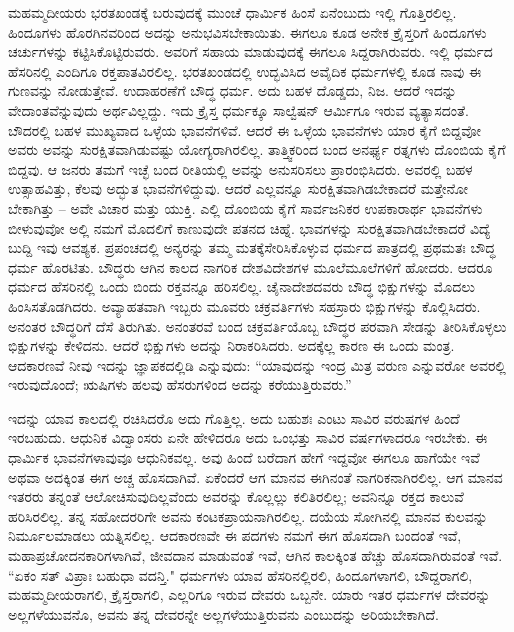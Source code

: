 ಮಹಮ್ಮದೀಯರು ಭರತಖಂಡಕ್ಕೆ ಬರುವುದಕ್ಕೆ ಮುಂಚೆ ಧಾರ್ಮಿಕ ಹಿಂಸೆ ಏನೆಂಬುದು ಇಲ್ಲಿ ಗೊತ್ತಿರಲಿಲ್ಲ. ಹಿಂದೂಗಳು ಹೊರಗಿನವರಿಂದ ಅದನ್ನು ಅನುಭವಿಸಬೇಕಾಯಿತು. ಈಗಲೂ ಕೂಡ ಅನೇಕ ಕ್ರೈಸ್ತರಿಗೆ ಹಿಂದೂಗಳು ಚರ್ಚುಗಳನ್ನು ಕಟ್ಟಿಸಿಕೊಟ್ಟಿರುವರು. ಅವರಿಗೆ ಸಹಾಯ ಮಾಡುವುದಕ್ಕೆ ಈಗಲೂ ಸಿದ್ದರಾಗಿರುವರು. ಇಲ್ಲಿ ಧರ್ಮದ ಹೆಸರಿನಲ್ಲಿ ಎಂದಿಗೂ ರಕ್ತಪಾತವಿರಲಿಲ್ಲ. ಭರತಖಂಡದಲ್ಲಿ ಉದ್ಭವಿಸಿದ ಅವೈದಿಕ ಧರ್ಮಗಳಲ್ಲಿ ಕೂಡ ನಾವು ಈ ಗುಣವನ್ನು ನೋಡುತ್ತೇವೆ. ಉದಾಹರಣೆಗೆ ಬೌದ್ಧ ಧರ್ಮ. ಅದು ಬಹಳ ದೊಡ್ಡದು, ನಿಜ. ಆದರೆ ಇದನ್ನು ವೇದಾಂತವೆನ್ನುವುದು ಅರ್ಥವಿಲ್ಲದ್ದು. ಇದು ಕ್ರೈಸ್ತ ಧರ್ಮಕ್ಕೂ ಸಾಲ್ವೆಷನ್ ಆರ್ಮಿಗೂ ಇರುವ ವ್ಯತ್ಯಾಸದಂತೆ. ಬೌದರಲ್ಲಿ ಬಹಳ ಮುಖ್ಯವಾದ ಒಳ್ಳೆಯ ಭಾವನೆಗಳಿವೆ. ಆದರೆ ಈ ಒಳ್ಳೆಯ ಭಾವನೆಗಳು ಯಾರ ಕೈಗೆ ಬಿದ್ದವೋ ಅವರು ಅವನ್ನು ಸುರಕ್ಷಿತವಾಗಿಡುವಷ್ಟು ಯೋಗ್ಯರಾಗಿರಲಿಲ್ಲ. ತಾತ್ತ್ವಿಕರಿಂದ ಬಂದ ಅನರ್ಘ್ಯ ರತ್ನಗಳು ದೊಂಬಿಯ ಕೈಗೆ ಬಿದ್ದವು. ಆ ಜನರು ತಮಗೆ ಇಚ್ಛೆ ಬಂದ ರೀತಿಯಲ್ಲಿ ಅವನ್ನು ಅನುಸರಿಸಲು ಪ್ರಾರಂಭಿಸಿದರು. ಅವರಲ್ಲಿ ಬಹಳ ಉತ್ಸಾಹವಿತ್ತು, ಕೆಲವು ಅದ್ಭುತ ಭಾವನೆಗಳಿದ್ದುವು. ಆದರೆ ಎಲ್ಲವನ್ನೂ ಸುರಕ್ಷಿತವಾಗಿಡಬೇಕಾದರೆ ಮತ್ತೇನೋ ಬೇಕಾಗಿತ್ತು – ಅವೇ ವಿಚಾರ ಮತ್ತು ಯುಕ್ತಿ. ಎಲ್ಲಿ ದೊಂಬಿಯ ಕೈಗೆ ಸಾರ್ವಜನಿಕರ ಉಪಕಾರಾರ್ಥ ಭಾವನೆಗಳು ಬೀಳುವುವೋ ಅಲ್ಲಿ ನಮಗೆ ಮೊದಲಿಗೆ ಕಾಣುವುದೇ ಪತನದ ಚಿಹ್ನೆ. ಭಾವಗಳನ್ನು ಸುರಕ್ಷಿತವಾಗಿಡಬೇಕಾದರೆ ವಿದ್ಯೆ ಬುದ್ದಿ ಇವು ಆವಶ್ಯಕ. ಪ್ರಪಂಚದಲ್ಲಿ ಅನ್ಯರನ್ನು ತಮ್ಮ ಮತಕ್ಕೆ\break ಸೇರಿಸಿಕೊಳ್ಳುವ ಧರ್ಮದ ಪಾತ್ರದಲ್ಲಿ ಪ್ರಥಮತಃ ಬೌದ್ಧ ಧರ್ಮ ಹೊರಟಿತು. ಬೌದ್ಧರು ಆಗಿನ ಕಾಲದ ನಾಗರಿಕ ದೇಶವಿದೇಶಗಳ ಮೂಲೆಮೂಲೆಗಳಿಗೆ ಹೋದರು. ಆದರೂ ಧರ್ಮದ ಹೆಸರಿನಲ್ಲಿ ಒಂದು ಬಿಂದು ರಕ್ತವನ್ನೂ ಹರಿಸಲಿಲ್ಲ. ಚೈನಾದೇಶದವರು ಬೌದ್ಧ ಭಿಕ್ಷುಗಳನ್ನು ಮೊದಲು ಹಿಂಸಿಸತೊಡಗಿದರು. ಅವ್ಯಾಹತವಾಗಿ ಇಬ್ಬರು ಮೂವರು ಚಕ್ರವರ್ತಿಗಳು ಸಹಸ್ರಾರು ಭಿಕ್ಷುಗಳನ್ನು ಕೊಲ್ಲಿಸಿದರು. ಅನಂತರ ಬೌದ್ಧರಿಗೆ ದೆಸೆ ತಿರುಗಿತು. ಅನಂತರವೆ ಬಂದ ಚಕ್ರವರ್ತಿಯೊಬ್ಬ ಬೌದ್ಧರ ಪರವಾಗಿ ಸೇಡನ್ನು ತೀರಿಸಿಕೊಳ್ಳಲು ಭಿಕ್ಷುಗಳನ್ನು ಕೇಳಿದನು. ಆದರೆ ಭಿಕ್ಷುಗಳು ಅದನ್ನು ನಿರಾಕರಿಸಿದರು. ಅದಕ್ಕೆಲ್ಲ ಕಾರಣ ಈ ಒಂದು ಮಂತ್ರ. ಆದಕಾರಣವೆ ನೀವು ಇದನ್ನು ಜ್ಞಾಪಕದಲ್ಲಿಡಿ ಎನ್ನುವುದು: “ಯಾವುದನ್ನು ಇಂದ್ರ ಮಿತ್ರ ವರುಣ ಎನ್ನುವರೋ ಅವರಲ್ಲಿ ಇರುವುದೊಂದೆ; ಋಷಿಗಳು ಹಲವು ಹೆಸರುಗಳಿಂದ ಅದನ್ನು ಕರೆಯುತ್ತಿರುವರು.”

ಇದನ್ನು ಯಾವ ಕಾಲದಲ್ಲಿ ರಚಿಸಿದರೊ ಅದು ಗೊತ್ತಿಲ್ಲ. ಅದು ಬಹುಶಃ ಎಂಟು ಸಾವಿರ ವರುಷಗಳ ಹಿಂದೆ ಇರಬಹುದು. ಆಧುನಿಕ ವಿದ್ವಾಂಸರು ಏನೇ ಹೇಳಿದರೂ ಅದು ಒಂಭತ್ತು ಸಾವಿರ ವರ್ಷಗಳಾದರೂ ಇರಬೇಕು. ಈ ಧಾರ್ಮಿಕ ಭಾವನೆಗಳಾವುವೂ ಆಧುನಿಕವಲ್ಲ. ಅವು ಹಿಂದೆ ಬರೆದಾಗ ಹೇಗೆ ಇದ್ದವೋ ಈಗಲೂ ಹಾಗೆಯೇ ಇವೆ ಅಥವಾ ಅದಕ್ಕಿಂತ ಈಗ ಅಚ್ಚ ಹೊಸದಾಗಿವೆ. ಏಕೆಂದರೆ ಆಗ ಮಾನವ ಈಗಿನಂತೆ ನಾಗರಿಕನಾಗಿರಲಿಲ್ಲ. ಆಗ ಮಾನವ ಇತರರು ತನ್ನಂತೆ ಆಲೋಚಿಸುವುದಿಲ್ಲವೆಂದು ಅವರನ್ನು ಕೊಲ್ಲಲ್ಲು ಕಲಿತಿರಲಿಲ್ಲ; ಅವನಿನ್ನೂ ರಕ್ತದ ಕಾಲುವೆ ಹರಿಸಿರಲಿಲ್ಲ. ತನ್ನ ಸಹೋದರರಿಗೇ ಅವನು ಕಂಟಕಪ್ರಾಯನಾಗಿರಲಿಲ್ಲ. ದಯೆಯ ಸೋಗಿನಲ್ಲಿ ಮಾನವ ಕುಲವನ್ನು ನಿರ್ಮೂಲಮಾಡಲು ಯತ್ನಿಸಲಿಲ್ಲ. ಆದಕಾರಣವೇ ಈ ಪದಗಳು ನಮಗೆ ಈಗ ಹೊಸದಾಗಿ ಬಂದಂತೆ ಇವೆ, ಮಹಾಪ್ರಚೋದನಕಾರಿಗಳಾಗಿವೆ, ಜೀವದಾನ ಮಾಡುವಂತೆ ಇವೆ, ಆಗಿನ ಕಾಲಕ್ಕಿಂತ ಹೆಚ್ಚು ಹೊಸದಾಗಿರುವಂತೆ ಇವೆ. “ಏಕಂ ಸತ್ ವಿಪ್ರಾಃ ಬಹುಧಾ ವದನ್ತಿ." ಧರ್ಮಗಳು ಯಾವ ಹೆಸರಿನಲ್ಲಿರಲಿ, ಹಿಂದೂಗಳಾಗಲಿ, ಬೌದ್ದರಾಗಲಿ, ಮಹಮ್ಮದೀಯರಾಗಲಿ, ಕ್ರೈಸ್ತರಾಗಲಿ, ಎಲ್ಲರಿಗೂ ಇರುವ ದೇವರು ಒಬ್ಬನೇ. ಯಾರು ಇತರ ಧರ್ಮಗಳ ದೇವರನ್ನು ಅಲ್ಲಗಳೆಯುವನೊ, ಅವನು ತನ್ನ ದೇವರನ್ನೇ ಅಲ್ಲಗಳೆಯುತ್ತಿರುವನು ಎಂಬುದನ್ನು ಅರಿಯಬೇಕಾಗಿದೆ.

